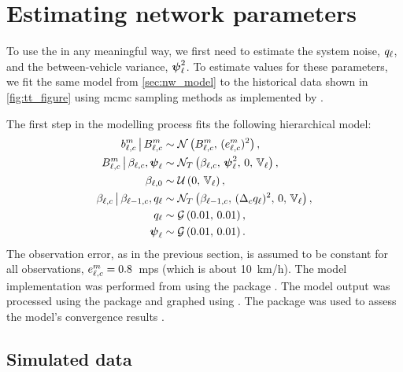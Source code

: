 
\section{Estimating network parameters}
\label{sec:nw_par_est}


To use the \kf{} in any meaningful way, we first need to estimate the system noise, $q_\ell$, and the between-vehicle variance, $\mathbf{\boldsymbol{\psi}}_{\ell}^2$. To estimate values for these parameters, we fit the same model from \cref{sec:nw_model} to the historical data shown in \cref{fig:tt_figure} using \gls{mcmc} sampling methods as implemented by  \citep{JAGS}.


The first step in the modelling process fits the following hierarchical model:
\begin{equation}
\label{eq:nw_model_simple}
\begin{split}
b_{\ell,c}^m \,\big|\, B_{\ell,c}^m &\sim \mathcal{N}\left(B_{\ell,c}^m,\, (e_{\ell,c}^m)^2\right), \\
B_{\ell,c}^m \,\big|\, \beta_{\ell,c}, \mathbf{\boldsymbol{\psi}}_{\ell} &\sim \mathcal{N}_T\left(\beta_{\ell,c},\, \mathbf{\boldsymbol{\psi}}_{\ell}^2,\, 0,\, \mathbb{V}_\ell\right), \\
\beta_{\ell,0} &\sim \mathcal{U}\left(0,\, \mathbb{V}_\ell\right), \\
\beta_{\ell,c} \,\big|\, \beta_{\ell-1,c}, q_\ell &\sim \mathcal{N}_T\left(\beta_{\ell-1,c},\, (\Delta_c q_{\ell})^2,\, 0,\, \mathbb{V}_\ell\right), \\
q_\ell &\sim \mathcal{G}\left(0.01,\, 0.01\right), \\
\mathbf{\boldsymbol{\psi}}_\ell &\sim \mathcal{G}\left(0.01,\, 0.01\right).
\end{split}
\end{equation}
The observation error, as in the previous section, is assumed to be constant for all observations, $e_{\ell,c}^m = 0.8$~\gls{mps} (which is about 10~km/h). The model implementation was performed from \Rstats{} using the  package \citep{rjags}. The model output was processed using the  package \citep{tidybayes} and graphed using  \citep{ggplot2}. The  package was used to assess the model's convergence results \citep{coda}.


\subsection{Simulated data}
\label{nw_par_est_sim}

